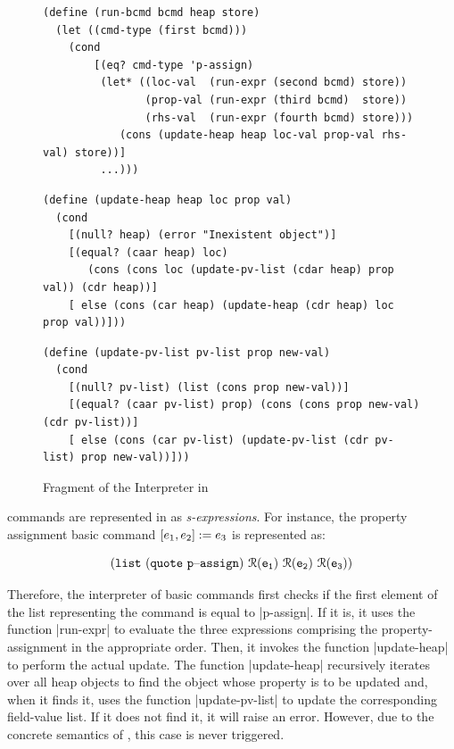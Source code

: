  

\lstset{language=Scheme, numbers = left}

\begin{figure}[t!]
\centering
\begin{lstlisting}
(define (run-bcmd bcmd heap store)
  (let ((cmd-type (first bcmd)))
    (cond
    	[(eq? cmd-type 'p-assign)
      	 (let* ((loc-val  (run-expr (second bcmd) store))
                (prop-val (run-expr (third bcmd)  store))
                (rhs-val  (run-expr (fourth bcmd) store)))
            (cons (update-heap heap loc-val prop-val rhs-val) store))]
         ...)))
\end{lstlisting}

\begin{lstlisting}
(define (update-heap heap loc prop val)
  (cond
    [(null? heap) (error "Inexistent object")]
    [(equal? (caar heap) loc)
       (cons (cons loc (update-pv-list (cdar heap) prop val)) (cdr heap))]
    [ else (cons (car heap) (update-heap (cdr heap) loc prop val))]))
\end{lstlisting}

\begin{lstlisting}         
(define (update-pv-list pv-list prop new-val)
  (cond
    [(null? pv-list) (list (cons prop new-val))]
    [(equal? (caar pv-list) prop) (cons (cons prop new-val) (cdr pv-list))]
    [ else (cons (car pv-list) (update-pv-list (cdr pv-list) prop new-val))]))
\end{lstlisting}
\vspace*{-0.3cm}
\caption{Fragment of the \jsil Interpreter in \rosette\label{rosette:interpreter:fragment}}
\vspace*{-0.5cm}
\end{figure}

\jsil commands are represented in \rosette as \emph{s-expressions}. 
 For instance, the property assignment basic command $[e_1, e_2] := e_3$
 is represented as: 

\vspace*{-0.2cm}
{\small $$
\mathtt{(list \ (quote\ {p\text{--}assign}) \ \roscomp{\jsilexpr_1} \ \roscomp{\jsilexpr_2} \ \roscomp{\jsilexpr_3})}
$$}
\vspace*{-0.4cm}

\noindent Therefore, the interpreter of basic commands first checks if the first element of the 
list representing the command is equal to \schemeinline|p-assign|. If it is, 
it uses the function \schemeinline|run-expr| to evaluate the three \jsil expressions 
comprising the property-assignment in the appropriate order. Then, it invokes the 
function \schemeinline|update-heap| to perform the actual update. 
The function \schemeinline|update-heap| recursively iterates over all heap objects
to find the object whose property is to be updated and, when it finds it, 
uses the function \schemeinline|update-pv-list| to update the corresponding 
field-value list. If it does not find it, it will raise an error. However, due to the concrete semantics of \jsil, this case is never triggered.

